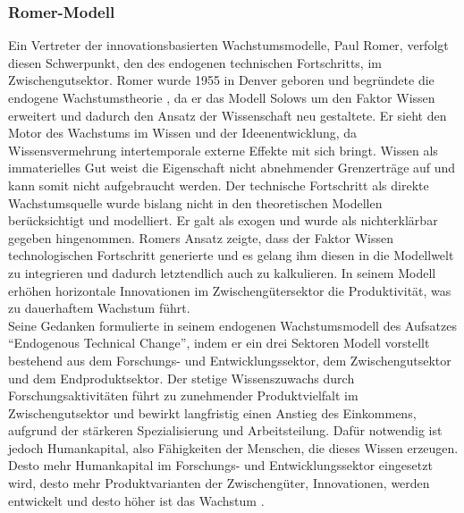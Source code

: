 \subsubsection*{Romer-Modell}
Ein Vertreter der innovationsbasierten Wachstumsmodelle, Paul Romer, verfolgt diesen Schwerpunkt, den des endogenen technischen Fortschritts, im Zwischengutsektor. Romer wurde 1955 in Denver geboren und begründete die endogene Wachstumstheorie \cite{Lin.2007}, da er das Modell Solows um den Faktor Wissen erweitert und dadurch den Ansatz der Wissenschaft neu gestaltete. Er sieht den Motor des Wachstums im Wissen und der Ideenentwicklung, da Wissensvermehrung intertemporale externe Effekte mit sich bringt. Wissen als immaterielles Gut weist die Eigenschaft nicht abnehmender Grenzerträge auf und kann somit nicht aufgebraucht werden. Der technische Fortschritt als direkte Wachstumsquelle wurde bislang nicht in den theoretischen Modellen berücksichtigt und modelliert. Er galt als exogen und wurde als nichterklärbar gegeben hingenommen.
Romers Ansatz zeigte, dass der Faktor Wissen technologischen Fortschritt generierte und es gelang ihm diesen in die Modellwelt zu integrieren und dadurch letztendlich auch zu kalkulieren. In seinem Modell erhöhen horizontale Innovationen im Zwischengütersektor die Produktivität, was zu dauerhaftem Wachstum führt.\\
%
Seine Gedanken formulierte \cite{Romer.1990} in seinem endogenen Wachstumsmodell des Aufsatzes "`Endogenous Technical Change"', indem er ein drei Sektoren Modell vorstellt bestehend aus dem Forschungs- und Entwicklungssektor, dem Zwischengutsektor und dem Endproduktsektor. Der stetige Wissenszuwachs durch Forschungsaktivitäten führt zu zunehmender Produktvielfalt im Zwischengutsektor und bewirkt langfristig einen Anstieg des Einkommens, aufgrund der stärkeren Spezialisierung und Arbeitsteilung. Dafür notwendig ist jedoch Humankapital, also Fähigkeiten der Menschen, die dieses Wissen erzeugen. Desto mehr Humankapital im Forschungs- und Entwicklungssektor eingesetzt wird, desto mehr Produktvarianten der Zwischengüter, Innovationen, werden entwickelt und desto höher ist das Wachstum \cite{Romer.1990}.\\
%

